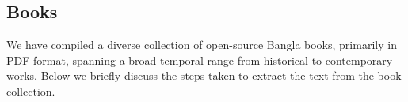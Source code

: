 


\subsection{Books}
We have compiled a diverse collection of open-source Bangla books, primarily in PDF format, spanning a broad temporal range from historical to contemporary works. Below we briefly discuss the steps taken to extract the text from the book collection.  





